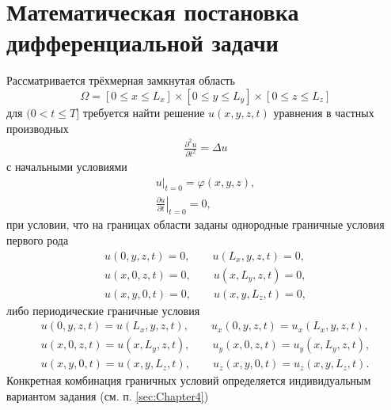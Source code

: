 \section{Математическая постановка дифференциальной задачи}
\label{sec:Chapter1} 
Рассматривается трёхмерная замкнутая область
\[
\Omega = [0 \leq x \leq L_x] \times [0 \leq y \leq L_y] \times [0 \leq z \leq L_z]
\]
для $(0 < t \leq T]$ требуется найти решение $u(x, y, z, t)$ уравнения в частных производных
\begin{align}
    \frac{\partial^2 u}{\partial t^2} = \Delta u \label{equation:1}
\end{align} 
с начальными условиями
\begin{align}
    \left.u\right|_{t=0} = \varphi(x,y,z), \label{equation:2}\\
    \left.\frac{\partial u}{\partial t}\right|_{t=0} = 0, \label{equation:3}
\end{align} 
при условии, что на границах области заданы однородные граничные условия первого рода
\begin{align}
    u(0, y, z, t) = 0,
    \qquad
    u(L_x, y, z, t) = 0,
    \label{equation:4}
    \\
    u(x, 0, z, t) = 0,
    \qquad
    u(x, L_y, z, t) = 0,
    \label{equation:5}
    \\
    u(x, y, 0, t) = 0,
    \qquad
    u(x, y, L_z, t) = 0,
    \label{equation:6}
\end{align}
либо периодические граничные условия 
\begin{align}
    u(0, y, z, t) = u(L_x, y, z, t),
    \qquad
    u_x(0, y, z, t) = u_x(L_x, y, z, t),
    \label{equation:7}
    \\
    u(x, 0, z, t) = u(x, L_y, z, t),
    \qquad
    u_y(x, 0, z, t) = u_y(x, L_y, z, t),
    \label{equation:8}
    \\
    u(x, y, 0, t) = u(x, y, L_z, t),
    \qquad
    u_z(x, y, 0, t) = u_z(x, y, L_z, t).
    \label{equation:9}
\end{align}
Конкретная комбинация граничных условий определяется индивидуальным вариантом задания (см. п. \ref{sec:Chapter4})
